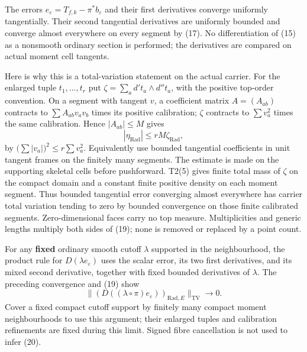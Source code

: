 \documentclass[
  10pt,
]{article}
\begin{document}
The errors \(e_\varepsilon=T_{f,k}-\pi^*b_\varepsilon\) and their first
derivatives converge uniformly tangentially. Their second tangential
derivatives are uniformly bounded and converge almost everywhere on
every segment by (17). No differentiation of (15) as a nonsmooth
ordinary section is performed; the derivatives are compared on actual
moment cell tangents.

Here is why this is a total-variation statement on the actual carrier.
For the enlarged tuple \(t_1,\ldots,t_r\) put
\(\zeta=\sum_a d't_a\wedge d''t_a\), with the positive top-order
convention. On a segment with tangent \(v\), a coefficient matrix
\(A=(A_{ab})\) contracts to \(\sum A_{ab}v_av_b\) times its positive
calibration; \(\zeta\) contracts to \(\sum v_a^2\) times the same
calibration. Hence \(|A_{ab}|\le M\) gives \[
       |\eta_{\mathrm{Rad}}|\le rM\zeta_{\mathrm{Rad}},    \tag{19}
\] by \(\big(\sum|v_a|\big)^2\le r\sum v_a^2\). Equivalently use bounded
tangential coefficients in unit tangent frames on the finitely many
segments. The estimate is made on the supporting skeletal cells before
pushforward. T2(5) gives finite total mass of \(\zeta\) on the compact
domain and a constant finite positive density on each moment segment.
Thus bounded tangential error converging almost everywhere has carrier
total variation tending to zero by bounded convergence on those finite
calibrated segments. Zero-dimensional faces carry no top measure.
Multiplicities and generic lengths multiply both sides of (19); none is
removed or replaced by a point count.

For any \textbf{fixed} ordinary smooth cutoff \(\lambda\) supported in
the neighbourhood, the product rule for \(D(\lambda e_\varepsilon)\)
uses the scalar error, its two first derivatives, and its mixed second
derivative, together with fixed bounded derivatives of \(\lambda\). The
preceding convergence and (19) show \[
       \big\|(D((\lambda\circ\pi)e_\varepsilon))_{
                          \mathrm{Rad},E}\big\|_{\mathrm{TV}}
                                 \longrightarrow0.       \tag{20}
\] Cover a fixed compact cutoff support by finitely many compact moment
neighbourhoods to use this argument; their enlarged tuples and
calibration refinements are fixed during this limit. Signed fibre
cancellation is not used to infer (20).
\end{document}
